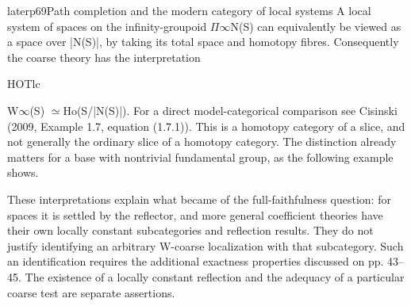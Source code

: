 \begin{dcomment}{later}{p69}{Path completion and the modern category of local systems}
A local system of spaces on the infinity-groupoid \ensuremath{\Pi}\ensuremath{\infty}N(S) can equivalently be viewed as a space over |N(S)|, by taking its total space and homotopy fibres. Consequently the coarse theory has the interpretation

HOTlc

W\ensuremath{\infty}(S) \ensuremath{\simeq}Ho(S/|N(S)|). For a direct model-categorical comparison see Cisinski (2009, Example 1.7, equation (1.7.1)). This is a homotopy category of a slice, and not generally the ordinary slice of a homotopy category. The distinction already matters for a base with nontrivial fundamental group, as the following example shows.

These interpretations explain what became of the full-faithfulness question: for spaces it is settled by the reflector, and more general coefficient theories have their own locally constant subcategories and reflection results. They do not justify identifying an arbitrary W-coarse localization with that subcategory. Such an identification requires the additional exactness properties discussed on pp. 43--45. The existence of a locally constant reflection and the adequacy of a particular coarse test are separate assertions.

\end{dcomment}

